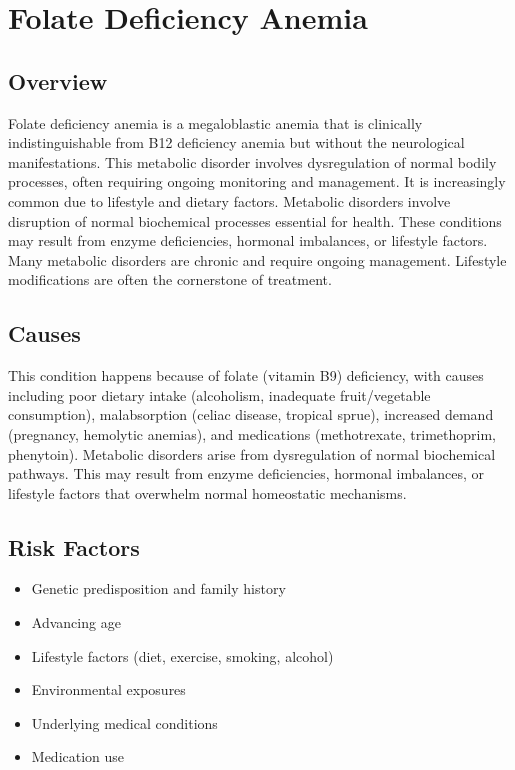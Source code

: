 \chapter{Folate Deficiency Anemia}
\label{sec:Folate Deficiency Anemia}

\section{Overview}
Folate deficiency anemia is a megaloblastic anemia that is clinically indistinguishable from B12 deficiency anemia but without the neurological manifestations. This metabolic disorder involves dysregulation of normal bodily processes, often requiring ongoing monitoring and management. It is increasingly common due to lifestyle and dietary factors. Metabolic disorders involve disruption of normal biochemical processes essential for health. These conditions may result from enzyme deficiencies, hormonal imbalances, or lifestyle factors. Many metabolic disorders are chronic and require ongoing management. Lifestyle modifications are often the cornerstone of treatment.
\section{Causes}
This condition happens because of folate (vitamin B9) deficiency, with causes including poor dietary intake (alcoholism, inadequate fruit/vegetable consumption), malabsorption (celiac disease, tropical sprue), increased demand (pregnancy, hemolytic anemias), and medications (methotrexate, trimethoprim, phenytoin). Metabolic disorders arise from dysregulation of normal biochemical pathways. This may result from enzyme deficiencies, hormonal imbalances, or lifestyle factors that overwhelm normal homeostatic mechanisms.   
\section{Risk Factors}
\begin{itemize}[noitemsep]
  \item Genetic predisposition and family history
  \item Advancing age
  \item Lifestyle factors (diet, exercise, smoking, alcohol)
  \item Environmental exposures
  \item Underlying medical conditions
  \item Medication use
\end{itemize}

